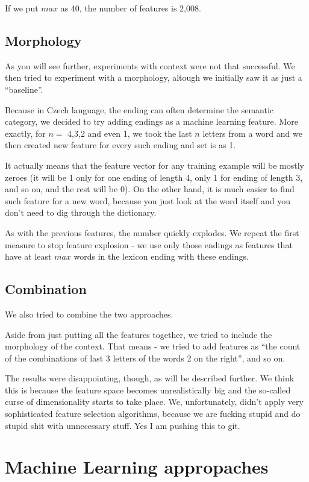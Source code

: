 \documentclass[letterpaper]{article}
\begin{document}
If we put $max$ as 40, the number of features is 2,008.

\subsection{Morphology}
As you will see further, experiments with context were not that successful. We then tried to experiment with a morphology, altough we initially saw it as just a ``baseline''.

Because in Czech language, the ending can often determine the semantic category, we decided to try adding endings as a machine learning feature. More exactly, for $n=$ 4,3,2 and even 1, we took the last $n$ letters from a word and we then created new feature for every such ending and set is as 1.

It actually means that the feature vector for any training example will be mostly zeroes (it will be 1 only for one ending of length 4, only 1 for ending of length 3, and so on, and the rest will be 0). On the other hand, it is much easier to find such feature for a new word, because you just look at the word itself and you don't need to dig through the dictionary.

As with the previous features, the number quickly explodes. We repeat the first measure to stop feature explosion - we use only those endings as features that have at least $max$ words in the lexicon ending with these endings.

\subsection{Combination}
We also tried to combine the two approaches.

Aside from just putting all the features together, we tried to include the morphology of the context. That means - we tried to add features as ``the count of the combinations of last 3 letters of the words 2 on the right'', and so on.

The results were disappointing, though, as will be described further. We think this is because the feature space becomes unrealistically big and the so-called  curse of dimensionality starts to take place. We, unfortunately, didn't apply very sophisticated feature selection algorithms, because  we are fucking stupid and do stupid shit with unnecessary stuff. Yes I am pushing this to git.


\section{Machine Learning appropaches}
\end{document}
